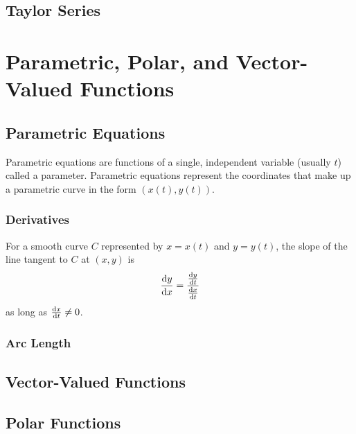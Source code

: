 \documentclass[letterpaper]{report}
\theoremstyle{definition}
\begin{document}
\section{Taylor Series}

\chapter{Parametric, Polar, and Vector-Valued Functions}

\section{Parametric Equations}
Parametric equations are functions of a single, independent variable 
(usually $t$) called a parameter.
Parametric equations represent the coordinates that make up a parametric curve
in the form $(x(t), y(t))$.

\subsection{Derivatives}
For a smooth curve $C$ represented by $x = x(t)$ and $y = y(t)$,
the slope of the line tangent to $C$ at $(x,y)$ is
\[ \dv{y}{x} = \frac{\dv{y}{t}}{\dv{x}{t}} \]
as long as $\dv{x}{t} \neq 0$. 

\subsection{Arc Length}

\section{Vector-Valued Functions}

\section{Polar Functions}
\end{document}
